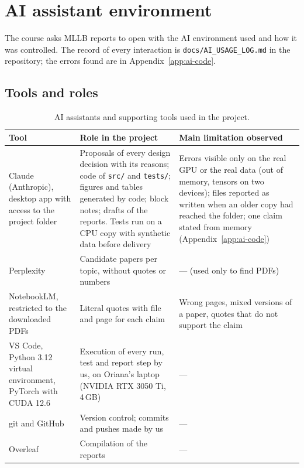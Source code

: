 \section{AI assistant environment}\label{sec:ai-env}

The course asks MLLB reports to open with the AI environment used and how it was controlled. The
record of every interaction is \texttt{docs/AI\_USAGE\_LOG.md} in the repository; the errors found are
in Appendix~\ref{app:ai-code}.

\subsection{Tools and roles}

\begin{table}[htbp]
\centering
\caption{AI assistants and supporting tools used in the project.}
\label{tab:ai-tools}
\small
\begin{tabularx}{\textwidth}{>{\raggedright\arraybackslash}p{3.4cm} >{\raggedright\arraybackslash}X >{\raggedright\arraybackslash}X}
\toprule
\textbf{Tool} & \textbf{Role in the project} & \textbf{Main limitation observed} \\
\midrule
Claude (Anthropic), desktop app with access to the project folder & Proposals of every design decision
with its reasons; code of \texttt{src/} and \texttt{tests/}; figures and tables generated by code; block
notes; drafts of the reports. Tests run on a CPU copy with synthetic data before delivery &
Errors visible only on the real GPU or the real data (out of memory, tensors on two devices); files
reported as written when an older copy had reached the folder; one claim stated from memory
(Appendix~\ref{app:ai-code}) \\
Perplexity & Candidate papers per topic, without quotes or numbers & --- (used only to find PDFs) \\
NotebookLM, restricted to the downloaded PDFs & Literal quotes with file and page for each claim &
Wrong pages, mixed versions of a paper, quotes that do not support the claim \\
\midrule
VS Code, Python 3.12 virtual environment, PyTorch with CUDA 12.6 & Execution of every run, test and
report step by us, on Oriana's laptop (NVIDIA RTX 3050 Ti, 4\,GB) & --- \\
git and GitHub & Version control; commits and pushes made by us & --- \\
Overleaf & Compilation of the reports & --- \\
\bottomrule
\end{tabularx}
\end{table}

